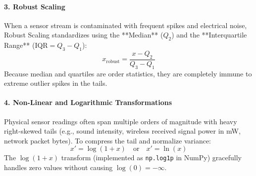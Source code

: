 \paragraph{3. Robust Scaling}
When a sensor stream is contaminated with frequent spikes and electrical noise, Robust Scaling standardizes using the **Median** ($Q_2$) and the **Interquartile Range** ($\text{IQR} = Q_3 - Q_1$):
\begin{equation}
x_{\text{robust}} = \frac{x - Q_2}{Q_3 - Q_1}\label{eq:robust_scaling}
\end{equation}
Because median and quartiles are order statistics, they are completely immune to extreme outlier spikes in the tails.

\paragraph{4. Non-Linear and Logarithmic Transformations}
Physical sensor readings often span multiple orders of magnitude with heavy right-skewed tails (e.g., sound intensity, wireless received signal power in mW, network packet bytes). To compress the tail and normalize variance:
\begin{equation}
x' = \log(1 + x) \quad \text{or} \quad x' = \ln(x)\label{eq:log_transform}
\end{equation}
The $\log(1 + x)$ transform (implemented as \texttt{np.log1p} in NumPy) gracefully handles zero values without causing $\log(0) = -\infty$.

